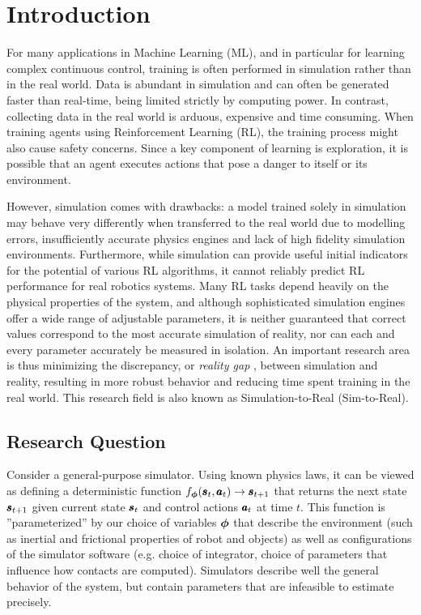 \chapter{Introduction}
\label{introduction}
For many applications in Machine Learning (ML), and in particular for learning complex continuous control, training is often performed in simulation rather than in the real world. Data is abundant in simulation and can often be generated faster than real-time, being limited strictly by computing power. In contrast, collecting data in the real world is arduous, expensive and time consuming. When training agents using Reinforcement Learning (RL), the training process might also cause safety concerns. Since a key component of learning is exploration, it is possible that an agent executes actions that pose a danger to itself or its environment.

However, simulation comes with drawbacks: a model trained solely in simulation may behave very differently when transferred to the real world due to modelling errors, insufficiently accurate physics engines and lack of high fidelity simulation environments. Furthermore, while simulation can provide useful initial indicators for the potential of various RL algorithms, it cannot reliably predict RL performance for real robotics systems. Many RL tasks depend heavily on the physical properties of the system, and although sophisticated simulation engines offer a wide range of adjustable parameters, it is neither guaranteed that correct values correspond to the most accurate simulation of reality, nor can each and every parameter accurately be measured in isolation. An important research area is thus minimizing the discrepancy, or \emph{reality gap} \parencite{Jakobi1995NoiseAT}, between simulation and reality, resulting in more robust behavior and reducing time spent training in the real world. This research field is also known as Simulation-to-Real (Sim-to-Real).

\section{Research Question}

Consider a general-purpose simulator. Using known physics laws, it can be viewed as defining a deterministic function $f_{\boldsymbol{\phi}}(\pmb{s}_t, \pmb{a}_t) \rightarrow \pmb{s}_{t+1}$ that returns the next state $\pmb{s}_{t+1}$ given current state $\pmb{s}_t$ and control actions $\pmb{a}_t$ at time $t$. This function is ''parameterized'' by our choice of variables $\boldsymbol{\phi}$ that describe the environment (such as inertial and frictional properties of robot and objects) as well as configurations of the simulator software (e.g. choice of integrator, choice of parameters that influence how contacts are computed). Simulators describe well the general behavior of the system, but contain parameters that are infeasible to estimate precisely.%


